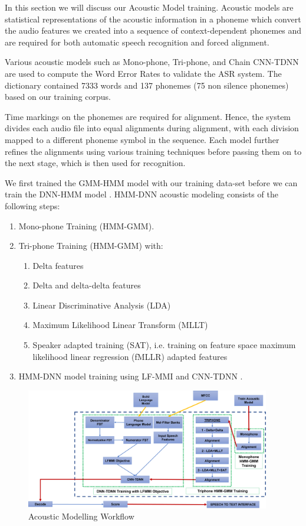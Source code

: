 In this section we will discuss our Acoustic Model training. Acoustic models are statistical representations of the acoustic information in a phoneme which convert the audio features we created into a sequence of context-dependent phonemes and are required for both automatic speech recognition and forced alignment. 

Various acoustic models such as Mono-phone, Tri-phone, and Chain CNN-TDNN are used to compute the Word Error Rates to validate the ASR system. The dictionary contained 7333 words and 137 phonemes (75 non silence phonemes) based on our training corpus.

Time markings on the phonemes are required for alignment. Hence, the system divides each audio file into equal alignments during alignment, with each division mapped to a different phoneme symbol in the sequence. Each model further refines the alignments using various training techniques before passing them on to the next stage, which is then used for recognition.

We first trained the GMM-HMM model with our training data-set before we can train the DNN-HMM model \cite{li_hybrid_2013}. HMM-DNN acoustic modeling consists of the following steps:
\begin{enumerate}
    \item Mono-phone Training (HMM-GMM).
    \item Tri-phone Training (HMM-GMM) with: 
    \begin{enumerate}[label=\alph*]
        \item Delta features
        \item Delta and delta-delta features
        \item Linear Discriminative Analysis (LDA)
        \item Maximum Likelihood Linear Transform (MLLT)
        \item Speaker adapted training (SAT), i.e. training on feature space maximum likelihood linear regression (fMLLR) adapted features
    \end{enumerate}
    \item HMM-DNN model training using LF-MMI and CNN-TDNN \cite{ghahremani_acoustic_2016}.
\end{enumerate} 

\begin{figure}[h]
    \centering
    \includegraphics[width=0.95\textwidth]{img/Training-acoustic-model.png}
    \caption{Acoustic Modelling Workflow}
    \label{fig:acoustic-modelling-flow}
\end{figure}

